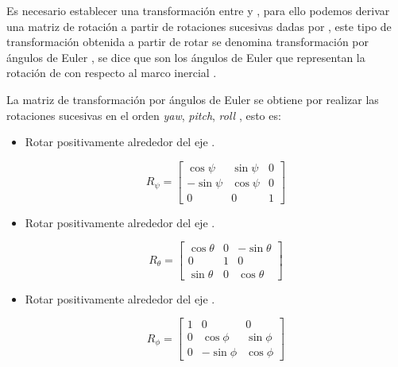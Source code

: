 Es necesario establecer una transformación entre  y , para ello podemos derivar una matriz de rotación a partir de rotaciones sucesivas dadas por \jim{\phi,\theta,\psi}, este tipo de transformación obtenida a partir de rotar \jim{\phi,\theta,\psi} se denomina transformación por ángulos de Euler \cite{eulerAngles}, se dice que \jim{\phi,\theta,\psi} son los ángulos de Euler que representan la rotación de  con respecto al marco inercial .

La matriz de transformación por ángulos de Euler se obtiene por realizar las rotaciones sucesivas en el orden \textit{yaw}, \textit{pitch}, \textit{roll} \cite{multidrone2015modeling}, esto es:

\begin{itemize}
    \item {
        Rotar positivamente \jim{\psi} alrededor del eje .

        \begin{equation}
            \label{eq:euler-yaw}
            R_{\psi} = 
                \begin{bmatrix}
                    \cos{\psi} & \sin{\psi} & 0 \\
                    -\sin{\psi} & \cos{\psi} & 0 \\
                    0 & 0 & 1 
                \end{bmatrix}
        \end{equation}
    }

    \item {
        Rotar positivamente \jim{\theta} alrededor del eje .

        \begin{equation}
            \label{eq:euler-pitch}
            R_{\theta} = 
                \begin{bmatrix}
                    \cos{\theta} & 0 & -\sin{\theta} \\
                    0 & 1 & 0 \\
                    \sin{\theta} & 0 & \cos{\theta} 
                \end{bmatrix}
        \end{equation}
    }

    \item {
        Rotar positivamente \jim{\phi} alrededor del eje .

        \begin{equation}
            \label{eq:euler-roll}
            R_{\phi} = 
                \begin{bmatrix}
                    1 & 0 & 0 \\
                    0 & \cos{\phi}  & \sin{\phi} \\
                    0 & -\sin{\phi} & \cos{\phi} 
                \end{bmatrix}
        \end{equation}
    }
\end{itemize}


